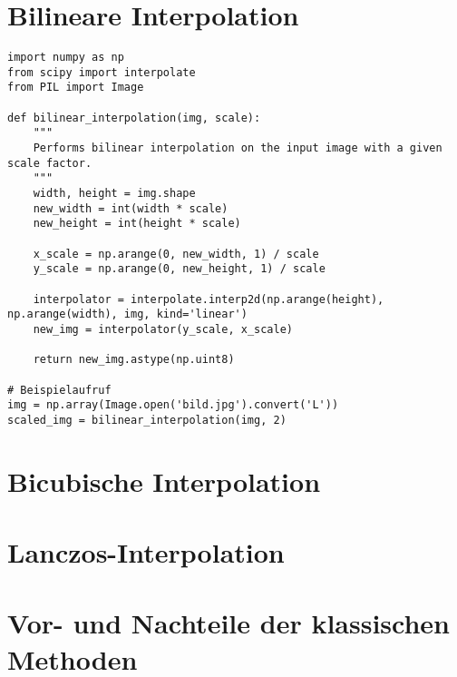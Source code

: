 \section{Bilineare Interpolation}
\begin{lstlisting}
import numpy as np
from scipy import interpolate
from PIL import Image

def bilinear_interpolation(img, scale):
    """
    Performs bilinear interpolation on the input image with a given scale factor.
    """
    width, height = img.shape
    new_width = int(width * scale)
    new_height = int(height * scale)
    
    x_scale = np.arange(0, new_width, 1) / scale
    y_scale = np.arange(0, new_height, 1) / scale
    
    interpolator = interpolate.interp2d(np.arange(height), np.arange(width), img, kind='linear')
    new_img = interpolator(y_scale, x_scale)
    
    return new_img.astype(np.uint8)

# Beispielaufruf
img = np.array(Image.open('bild.jpg').convert('L'))
scaled_img = bilinear_interpolation(img, 2)
\end{lstlisting}

\section{Bicubische Interpolation}

\section{Lanczos-Interpolation}
\section{Vor- und Nachteile der klassischen Methoden}
